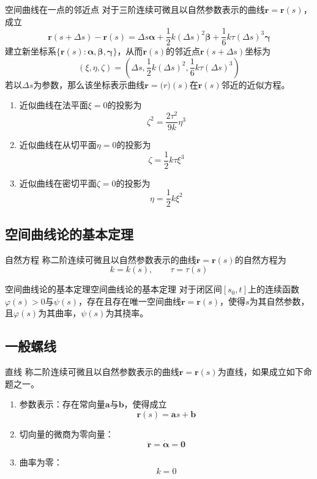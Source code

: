 \documentclass[lang = cn, scheme = chinese, thmcnt = section]{elegantbook}
\newcommand{\bs}{\boldsymbol}          %
\begin{document}
\begin{theorem}{空间曲线在一点的邻近点}
	对于三阶连续可微且以自然参数表示的曲线$\bs{r}=\bs{r}(s)$，成立
	$$
	\bs{r}(s+\Delta s)-\bs{r}(s)
	=\Delta s\bs{\alpha}
	+\frac{1}{2}k(\Delta s)^2\bs{\beta}
	+\frac{1}{6}k\tau(\Delta s)^3\bs{\gamma}
	$$
	建立新坐标系$\{ \bs{r}(s):\bs{\alpha},\bs{\beta},\bs{\gamma} \}$，从而$\bs{r}(s)$的邻近点$\bs{r}(s+\Delta s)$坐标为
	$$
	(\xi,\eta,\zeta)
	=\left(\Delta s,\frac{1}{2}k(\Delta s)^2,\frac{1}{6}k\tau(\Delta s)^3\right)
	$$
	若以$\Delta s$为参数，那么该坐标表示曲线$\bs{r}=\bs(r)(s)$在$\bs{r}(s)$邻近的近似方程。
	\begin{enumerate}
		\item 近似曲线在法平面$\xi=0$的投影为
		$$
		\zeta^2=\frac{2\tau^2}{9k}\eta^3
		$$
		\item 近似曲线在从切平面$\eta=0$的投影为
		$$
		\zeta=\frac{1}{2}k\tau\xi^3
		$$
		\item 近似曲线在密切平面$\zeta=0$的投影为
		$$
		\eta=\frac{1}{2}k\xi^2
		$$
	\end{enumerate}
\end{theorem}

\subsection{空间曲线论的基本定理}

\begin{definition}{自然方程}
	称二阶连续可微且以自然参数表示的曲线$\bs{r}=\bs{r}(s)$的自然方程为
	$$
	k=k(s),\qquad 
	\tau=\tau(s)
	$$
\end{definition}

\begin{theorem}{空间曲线论的基本定理}{空间曲线论的基本定理}
	对于闭区间$[s_0,t]$上的连续函数$\varphi(s)>0$与$\psi(s)$，存在且存在唯一空间曲线$\bs{r}=\bs{r}(s)$，使得$s$为其自然参数，且$\varphi(s)$为其曲率，$\psi(s)$为其挠率。
\end{theorem}

\subsection{一般螺线}

\begin{definition}{直线}
	称二阶连续可微且以自然参数表示的曲线$\bs{r}=\bs{r}(s)$为直线，如果成立如下命题之一。
	\begin{enumerate}
		\item 参数表示：存在常向量$\bs{a}$与$\bs{b}$，使得成立
		$$
		\bs{r}(s)=\bs{a}s+\bs{b}
		$$
		\item 切向量的微商为零向量：
		$$
		\ddot{\bs{r}}=\dot{\bs{\alpha}}=\bs{0}
		$$
		\item 曲率为零：
		$$
		k=0
		$$
	\end{enumerate}
\end{definition}
\end{document}
